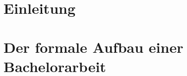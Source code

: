 %
\chapter{Einleitung}


%
%
%
\chapter{Der formale Aufbau einer Bachelorarbeit}
%
%




% 
%
\seAppendix{}



%
%
%
%
\newpage
\sePrintGlossary{}


%
%
\sePrintBibliography{}




%
%


%
%
%

%
% 


%
%
%
\seEhrenwoertlicheErklaerung{} %














